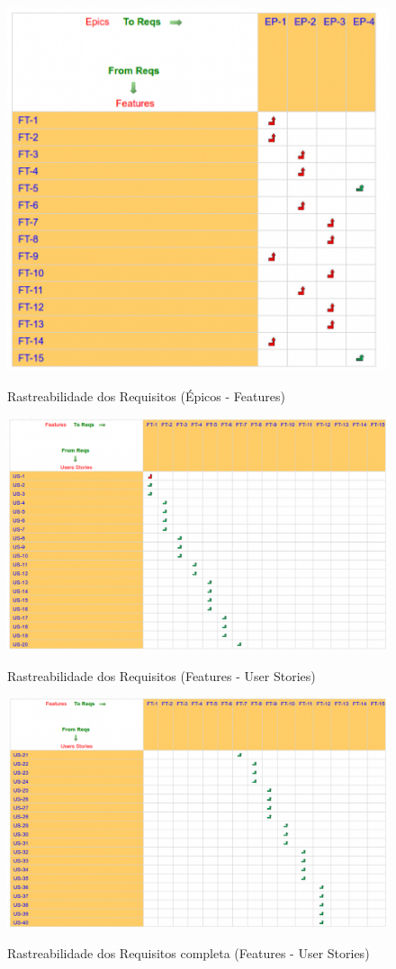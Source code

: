 \FloatBarrier
\begin{figure}[!htpd]
		\centering
		\includegraphics[scale=0.4]{figuras/rast1}
		\label{img:rast1}
		\caption{Rastreabilidade dos Requisitos (Épicos - Features)}
\end{figure}
\FloatBarrier

\FloatBarrier
\begin{figure}[!htpd]
		\centering
		\includegraphics[scale=0.25]{figuras/rast2}
		\label{img:rast2}
		\caption{Rastreabilidade dos Requisitos (Features - User Stories)}
\end{figure}
\FloatBarrier

\FloatBarrier
\begin{figure}[!htpd]
		\centering
		\includegraphics[scale=0.25]{figuras/rast3}
		\label{img:rast3}
		\caption{Rastreabilidade dos Requisitos completa (Features - User Stories)}
\end{figure}
\FloatBarrier
